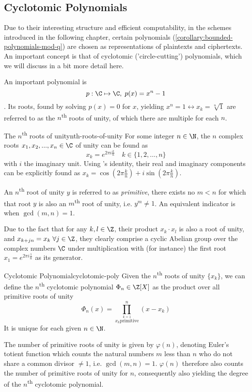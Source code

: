 \subsection{Cyclotomic Polynomials}
Due to their interesting structure and efficient computability, in the schemes introduced in the following chapter, certain polynomials (\autoref{corollary:bounded-polynomials-mod-q}) are chosen as representations of plaintexts and ciphertexts.
An important concept is that of cyclotomic ('circle-cutting') polynomials, which we will discuss in a bit more detail here.

An important polynomial is $$p: \C \mapsto \C, \; p(x) = x^n - 1$$.
Its roots, found by solving $p(x) = 0$ for $x$, yielding $x^n = 1 \leftrightarrow x_k = \sqrt[n]{1}$ are referred to as the $n$\textsuperscript{th} roots of unity, of which there are multiple for each $n$.

\begin{lemma}{The $n$\textsuperscript{th} roots of unity}{nth-roots-of-unity}
  For some integer $n \in \N$, the $n$ complex roots $x_1, x_2, ..., x_n \in \C$ of unity
  can be found as $$x_k = e^{2\pi i \frac{k}{n}} \quad k \in \{1, 2, ..., n\}$$
  with $i$ the imaginary unit.
  Using 's identity, their real and imaginary components can be explicitly found as
  $x_k = \cos(2\pi \frac{k}{n}) + i \sin(2\pi \frac{k}{n})$.

  An $n$\textsuperscript{th} root of unity $y$ is referred to as \textit{primitive}, 
  there exists no $m < n$ for which that root $y$ is also an $m$\textsuperscript{th} root of unity, i.e. $y^m \neq 1$.
  An equivalent indicator is when $\gcd(m, n) = 1$.
\end{lemma}
Due to the fact that for any $k, l \in \Z$, their product $x_k \cdot x_l$ is also a root of unity, and
$x_{k+jn} = x_k \; \forall j \in \Z$, they clearly comprise a cyclic Abelian group over the complex numbers
$\C$ under multiplication with (for instance) the first root $x_1 = e^{2\pi i \frac{1}{n}}$ as its generator.

\begin{definition}{Cyclotomic Polynomial}{cyclotomic-poly}
  Given the $n$\textsuperscript{th} roots of unity $\{x_k\}$, we can define the $n$\textsuperscript{th}
  cyclotomic polynomial $\Phi_n \in \Z[X]$ as the product over all primitive roots of unity
  $$\Phi_n(x) = \prod_{\stackrel{k=1}{x_k \mathrm{primitive}}}^{n} (x - x_k)$$
  It is unique for each given $n \in \N$.
\end{definition}
The number of primitive roots of unity is given by $\varphi(n)$, denoting Euler's totient function which counts the
natural numbers $m$ less than $n$ who do not share a common divisor $\neq 1$, i.e. $\gcd(m, n) = 1$.
$\varphi(n)$ therefore also counts the number of primitive roots of unity for $n$,
consequently also yielding the degree of the $n$\textsuperscript{th} cyclotomic polynomial.


